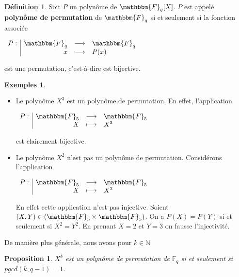\documentclass[12pt]{article}
\newcommand{\F}{\mathbbm{F}}
\newcommand{\Fq}{\mathds{F}_q}
\newtheorem{prop}{Proposition}
\theoremstyle{definition}
\newtheorem{definition}{Définition}
\newtheorem*{examples}{Exemples}
\begin{document}
\begin{definition}
Soit $P$ un polynôme de $\F_q [X]$. $P$ est appelé \textbf{polynôme de permutation} de $\F_q$ si et seulement si la fonction associée
\begin{center}
$
\begin{array}{l|rcl}
\displaystyle
P : & \F _q & \longrightarrow & \F _q \\
    & x & \longmapsto & P(x)
\end{array}
$
\end{center}
est une permutation, c'est-à-dire est bijective.
\end{definition}
\vspace{24pt}
\begin{examples}
	\begin{itemize}
On se place dans $\F_5$.\\
\item[1.] Le polynôme $X^3$ est un polynôme de permutation. En effet, l'application\\
\begin{center}
$
\begin{array}{l|rcl}
\displaystyle
P : & \F _5 & \longrightarrow & \F _5 \\
    & X & \longmapsto & X^3
\end{array}
$
\end{center}
\vspace{10pt}
est clairement bijective.\\
\item[2.] Le polynôme $X^2$ n'est pas un polynôme de permutation. Considérons l'application \\
\begin{center}
$
\begin{array}{l|rcl}
\displaystyle
P : & \F _5 & \longrightarrow & \F _5 \\
    & X & \longmapsto & X^2
\end{array}
$
\end{center}
\vspace{12pt}
En effet cette application n'est pas injective. Soient $(X,Y) \in (\F_5 \times \F_5)$. On a $P(X)=P(Y)$ si et seulement si $X^2=Y^2$. En prenant $X=2$ et $Y=3$ on fausse l'injectivité.
	\end{itemize}
\end{examples}

De manière plus générale, nous avons pour $k \in \mathds{N}$

\begin{prop}
$X^k$ est un polynôme de permutation de $\Fq$ si et seulement si $pgcd(k, q-1) = 1$.
\end{prop}
\end{document}
